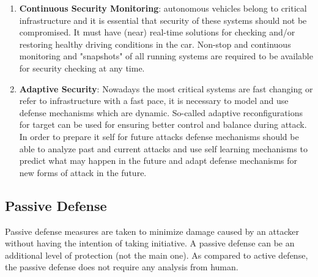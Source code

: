 \begin{enumerate}
	\item \textbf{Continuous Security Monitoring}: autonomous vehicles belong to critical infrastructure and it is essential that security of these systems should not be compromised. It must have (near) real-time solutions for checking and/or restoring healthy driving conditions in the car. Non-stop and continuous monitoring and "snapshots" of all running systems are required to be available for security checking at any time. 
	\item \textbf{Adaptive Security}: Nowadays the most critical systems are fast changing or refer to infrastructure with a fast pace, it is necessary to model and use defense mechanisms which are dynamic. So-called adaptive reconfigurations for target can be used for ensuring better control and balance during attack. In order to prepare it self for future attacks defense mechanisms should be able to analyze past and current attacks and use self learning mechanisms to predict what may happen in the future and adapt defense mechanisms for new forms of attack in the future.
\end{enumerate}	
		
\subsection{Passive Defense}
Passive defense measures are taken to minimize damage caused by an attacker without having the intention of taking initiative. A passive defense can be an additional level of protection (not the main one). As compared to active defense, the passive defense does not require any analysis from human.


